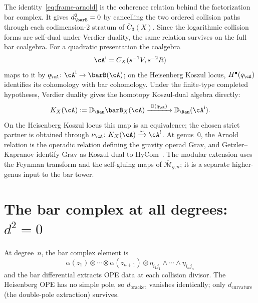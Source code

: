 \begin{remark}
\label{rem:frame-arnold-factorization}
The identity~\eqref{eq:frame-arnold} is the coherence relation behind
the factorization bar complex. It gives $d_{\barB}^2=0$ by cancelling
the two ordered collision paths through each codimension-$2$ stratum of
\(\overline C_3(X)\). Since the logarithmic collision forms are
self-dual under Verdier duality, the same relation survives on the
full bar coalgebra.  For a quadratic presentation the coalgebra
\[
\cA^{\mathrm i}=C_X(s^{-1}V,s^{-2}R)
\]
maps to it by $q_\cA\colon\cA^{\mathrm i}\to\barB(\cA)$; on the
Heisenberg Koszul locus, $H^\bullet(q_\cA)$ identifies its cohomology
with bar cohomology.
Under the finite-type completed hypotheses, Verdier duality gives the
homotopy Koszul-dual algebra directly:
\[
K_X(\cA):=\mathbb{D}_{\Ran}\barB_X(\cA)
\xrightarrow{\ \mathbb D(q_\cA)\ }
\mathbb{D}_{\Ran}(\cA^{\mathrm i}).
\]
On the Heisenberg Koszul locus this map is an equivalence; the chosen
strict partner is obtained through
$\nu_\cA\colon K_X(\cA)\xrightarrow{\sim}\cA^!$.
At genus~$0$, the Arnold relation is the operadic relation defining
the gravity operad \(\mathrm{Grav}\), and Getzler--Kapranov identify
\(\mathrm{Grav}\) as Koszul dual to \(\mathrm{HyCom}\)~\cite{GK94}.
The modular extension uses the Feynman transform and the self-gluing
maps of \(\overline{\mathcal M}_{g,n}\); it is a separate higher-genus
input to the bar tower.
\end{remark}

\section{\texorpdfstring{The bar complex at all degrees: $d^2 = 0$}{The bar complex at all degrees: d squared equals zero}}
\label{sec:frame-bar-all}

At degree~$n$, the bar complex element is
\begin{equation}\label{eq:frame-barn-element}
\alpha(z_1) \otimes \cdots \otimes \alpha(z_{n+1})
\otimes \eta_{i_1 j_1} \wedge \cdots \wedge \eta_{i_n j_n}
\end{equation}
and the bar differential extracts OPE data at each collision divisor.
The Heisenberg OPE has no simple pole, so $d_{\mathrm{bracket}}$
vanishes identically; only $d_{\mathrm{curvature}}$ (the double-pole
extraction) survives.

